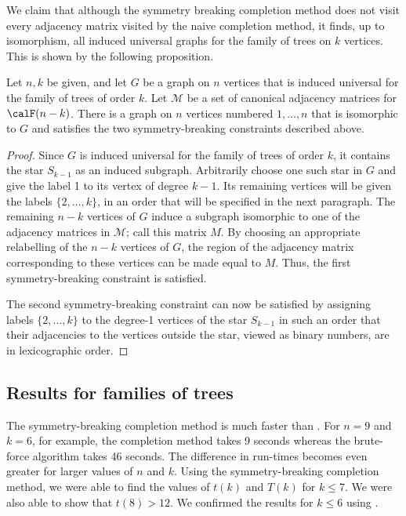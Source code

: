 We claim that although the symmetry breaking completion method does not
visit every adjacency matrix visited by the naive completion method,
it finds, up to isomorphism, all induced universal graphs for the family
of trees on $k$ vertices.  This is shown by the following proposition.

\begin{proposition}
    Let $n, k$ be given, and let $G$ be a graph on $n$ vertices that is
    induced universal for the family of trees of order $k$.  Let $\mathcal{M}$
    be a set of canonical adjacency matrices for $\calF(n-k)$.  There is
    a graph on $n$ vertices numbered $1, \dots, n$ that is isomorphic
    to $G$ and satisfies the two symmetry-breaking constraints described
    above.
\end{proposition}
\begin{proof}
    Since $G$ is induced universal for the family of trees of order $k$, it
    contains the star $S_{k-1}$ as an induced subgraph.  Arbitrarily
    choose one such star in $G$ and give the label 1 to its vertex of degree
    $k-1$.  Its remaining vertices will be given the labels $\{2, \dots, k\}$,
    in an order that will be specified in the next paragraph.
    The remaining $n-k$ vertices of $G$ induce a subgraph isomorphic
    to one of the adjacency matrices in $\mathcal{M}$; call this matrix $M$.
    By choosing an appropriate relabelling of the $n-k$ vertices of $G$,
    the region of the adjacency matrix corresponding to these vertices
    can be made equal to $M$.  Thus, the first symmetry-breaking constraint
    is satisfied.

    The second symmetry-breaking constraint can now be satisfied by assigning
    labels $\{2, \dots, k\}$ to the degree-1 vertices of the star $S_{k-1}$
    in such an order that their adjacencies to the vertices outside the star,
    viewed as binary numbers, are in lexicographic order.
\end{proof}

\subsection{Results for families of trees}

The symmetry-breaking completion method is much faster than .
For $n=9$ and $k=6$, for example, the completion method takes 9 seconds whereas
the brute-force algorithm takes 46 seconds. The difference in run-times becomes
even greater for larger values of $n$ and $k$.
Using the symmetry-breaking completion method,
we were able to find the values of $t(k)$ and $T(k)$ for $k \leq 7$. We were also
able to show that $t(8) > 12$.  We confirmed
the results for $k \leq 6$ using .

